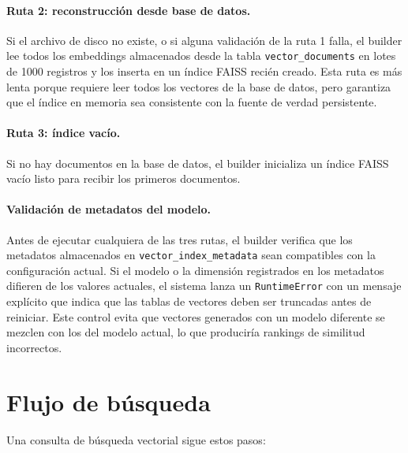 \documentclass[11pt]{article}
\begin{document}
\paragraph{Ruta 2: reconstrucción desde base de datos.}
Si el archivo de disco no existe, o si alguna validación de la ruta 1 falla, el builder lee
todos los embeddings almacenados desde la tabla \texttt{vector\_documents} en lotes de 1000
registros y los inserta en un índice FAISS recién creado. Esta ruta es más lenta porque
requiere leer todos los vectores de la base de datos, pero garantiza que el índice en memoria
sea consistente con la fuente de verdad persistente.

\paragraph{Ruta 3: índice vacío.}
Si no hay documentos en la base de datos, el builder inicializa un índice FAISS vacío listo
para recibir los primeros documentos.

\paragraph{Validación de metadatos del modelo.}
Antes de ejecutar cualquiera de las tres rutas, el builder verifica que los metadatos
almacenados en \texttt{vector\_index\_metadata} sean compatibles con la configuración actual.
Si el modelo o la dimensión registrados en los metadatos difieren de los valores actuales, el
sistema lanza un \texttt{RuntimeError} con un mensaje explícito que indica que las tablas de
vectores deben ser truncadas antes de reiniciar. Este control evita que vectores generados
con un modelo diferente se mezclen con los del modelo actual, lo que produciría rankings de
similitud incorrectos.

\section{Flujo de búsqueda}

Una consulta de búsqueda vectorial sigue estos pasos:
\end{document}
